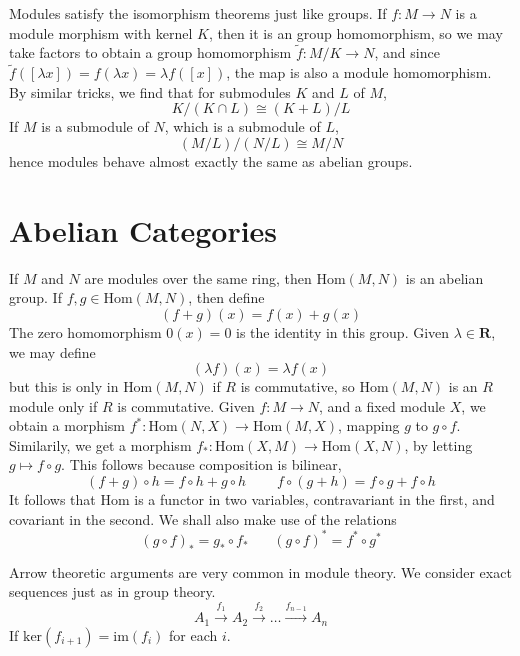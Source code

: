 Modules satisfy the isomorphism theorems just like groups. If $f:M \to N$ is a module morphism with kernel $K$, then it is an group homomorphism, so we may take factors to obtain a group homomorphism $\tilde{f}: M/K \to N$, and since $\tilde{f}([\lambda x]) = f(\lambda x) = \lambda f([x])$, the map is also a module homomorphism. By similar tricks, we find that for submodules $K$ and $L$ of $M$,
%
\[ K/(K \cap L) \cong (K + L)/L \]
%
If $M$ is a submodule of $N$, which is a submodule of $L$,
%
\[ (M/L)/(N/L) \cong M/N \]
%
hence modules behave almost exactly the same as abelian groups.

\section{Abelian Categories}

If $M$ and $N$ are modules over the same ring, then $\text{Hom}(M,N)$ is an abelian group. If $f,g \in \text{Hom}(M,N)$, then define
%
\[ (f + g)(x) = f(x) + g(x) \]
%
The zero homomorphism $0(x) = 0$ is the identity in this group. Given $\lambda \in \mathbf{R}$, we may define
%
\[ (\lambda f)(x) = \lambda f(x) \]
%
but this is only in $\text{Hom}(M,N)$ if $R$ is commutative, so $\text{Hom}(M,N)$ is an $R$ module only if $R$ is commutative. Given $f: M \to N$, and a fixed module $X$, we obtain a morphism $f^*: \text{Hom}(N,X) \to \text{Hom}(M,X)$, mapping $g$ to $g \circ f$. Similarily, we get a morphism $f_*: \text{Hom}(X,M) \to \text{Hom}(X,N)$, by letting $g \mapsto f \circ g$. This follows because composition is bilinear,
%
\[ (f + g) \circ h = f \circ h + g \circ h\ \ \ \ \ \ \ \ \ \ f \circ (g + h) = f \circ g + f \circ h \]
It follows that $\text{Hom}$ is a functor in two variables, contravariant in the first, and covariant in the second. We shall also make use of the relations
%
\[ (g \circ f)_* = g_* \circ f_*\ \ \ \ \ \ \ \ (g \circ f)^* = f^* \circ g^* \]

Arrow theoretic arguments are very common in module theory. We consider exact sequences just as in group theory.
%
\[ A_1 \xrightarrow{f_1} A_2 \xrightarrow{f_2} \dots \xrightarrow{f_{n-1}} A_n \]
%
If $\text{ker}(f_{i+1}) = \text{im}(f_i)$ for each $i$.

